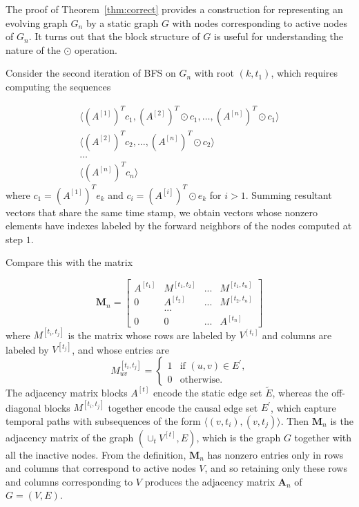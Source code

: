 \documentclass[10pt,conference,compsocconf]{IEEEtran}
\theoremstyle{definition}
\begin{document}
The proof of Theorem~\ref{thm:correct} provides a construction for representing
an evolving graph $G_n$ by a static graph $G$ with nodes corresponding to active
nodes of $G_n$. It turns out that the block structure of $G$ is useful for
understanding the nature of the $\odot$ operation.

Consider the second iteration of BFS on $G_n$ with root $(k, t_1)$, which
requires computing the sequences

\begin{subequations}
\begin{align}
  \label{eq:5}
 \big\langle (A^{[1]})^Tc_1,   (A^{[2]})^T\odot c_1, \ldots,  (A^{[n]})^T\odot c_1  \big\rangle  \\
\big\langle (A^{[2]})^Tc_{2}, \ldots, (A^{[n]})^T\odot c_{2} \big\rangle \\
 \ldots  \\
  \big\langle (A^{[n]})^Tc_n \big\rangle
\label{eq:6}
\end{align}
\end{subequations}
%
where $c_1 = (A^{[1]})^Te_k$ and $c_i = (A^{[i]})^T \odot e_k$ for $i>1$.
Summing resultant vectors that share the same
time stamp, we obtain vectors whose nonzero elements have indexes labeled by
the forward neighbors of the nodes computed at step $1$.

Compare this with the matrix

\[
\bm M_n = \begin{bmatrix}
A^{[t_1]} & M^{[t_1, t_2]} & ... & M^{[t_1, t_n]} \\
        0 & A^{[t_2]}      & ... & M^{[t_2, t_n]} \\
                           &   ... \\
        0 & 0 & ... & A^{[t_n]}
\end{bmatrix}
\]
%
where $M^{[t_i, t_j]}$ is the matrix whose rows are labeled by $V^{[t_i]}$ and
columns are labeled by $V^{[t_j]}$, and whose entries are
\[
M^{[t_i, t_j]}_{uv} =
\begin{cases}
1 & \mbox{if $(u,v)\in E^\prime$,} \\
0 & \mbox{otherwise.}
\end{cases}
\]
%
The adjacency matrix blocks $A^{[t]}$ encode the static edge set $\tilde E$,
whereas the off-diagonal blocks $M^{[t_i, t_j]}$ together encode the causal edge
set $E^\prime$, which capture temporal paths with subsequences of the form
$\langle (v, t_i), (v, t_j) \rangle$. Then $\bm M_n$ is the adjacency matrix of
the graph $(\cup_t V^{[t]}, E)$, which is the graph $G$ together with all the
inactive nodes. From the definition, $\bm M_n$ has nonzero
entries only in rows and columns that correspond to active nodes $V$, and so
retaining only these rows and columns corresponding to $V$ produces the
adjacency matrix $\bm A_n$ of $G = (V, E)$.
\end{document}
